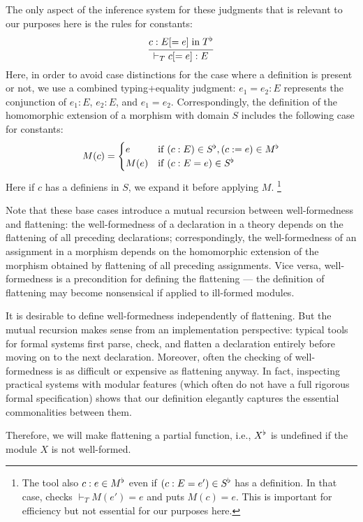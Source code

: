 The only aspect of the inference system for these judgments that is relevant to our purposes here is the rules for constants:
\[\cfrac{c:E[=e] \;\mathrm{in}\; T^\flat}{\vdash_T c[=e]:E}\,\]
Here, in order to avoid case distinctions for the case where a definition is present or not, we use a combined typing+equality judgment: $e_1=e_2:E$ represents the conjunction of $e_1:E$, $e_2:E$, and $e_1=e_2$.
Correspondingly, the definition of the homomorphic extension of a morphism with domain $S$ includes the following case for constants:
\[M(c) = \begin{cases}e&\mathrm{if}\; (c:E) \in S^\flat, (c:=e)\in M^\flat \\ M(e) &\mathrm{if}\; (c:E=e)\in S^\flat\end{cases}\]
Here if $c$ has a definiens in $S$, we expand it before applying $M$.%
\footnote{The \mmt tool also $c:e\in M^\flat$ even if $(c:E=e')\in S^\flat$ has a definition. In that case, \mmt checks $\vdash_T M(e')=e$ and puts $M(c)=e$. This is important for efficiency but not essential for our purposes here.}

Note that these base cases introduce a mutual recursion between well-formedness and flattening:
the well-formedness of a declaration in a theory depends on the flattening of all preceding declarations;
correspondingly, the well-formedness of an assignment in a morphism depends on the homomorphic extension of the morphism obtained by flattening of all preceding assignments.
Vice versa, well-formedness is a precondition for defining the flattening --- the definition of flattening may become nonsensical if applied to ill-formed modules.

It is desirable to define well-formedness independently of flattening.
But the mutual recursion makes sense from an implementation perspective: typical tools for formal systems first parse, check, and flatten a declaration entirely before moving on to the next declaration.
Moreover, often the checking of well-formedness is as difficult or expensive as flattening anyway.
In fact, inspecting practical systems with modular features (which often do not have a full rigorous formal specification) shows that our definition elegantly captures the essential commonalities between them.

Therefore, we will make flattening a partial function, i.e., $X^\flat$ is undefined if the module $X$ is not well-formed. 

%

